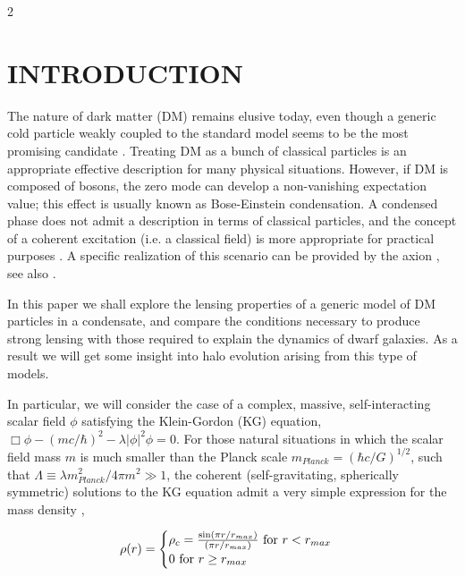 \documentclass {article}
\begin{document}
\begin {multicols} {2}


\section {\normalsize {INTRODUCTION}}


The nature of dark matter (DM) remains elusive today, even though a generic cold particle weakly coupled to the standard model seems to be the most promising candidate \cite {Bertone_2005}. Treating DM as a bunch of classical particles is an appropriate effective description for many physical situations. However, if DM is composed of bosons, the zero mode can develop a non-vanishing expectation value; this effect is usually known as Bose-Einstein condensation. A condensed phase does not admit a description in terms of classical particles, and the concept of a coherent excitation (i.e. a classical field) is more appropriate for practical purposes \cite {Chavanis_2012}. A specific realization of this scenario can be provided by the axion \cite {Sikivie_2009}, see also \cite {B_hm_2004}.


In this paper we shall explore the lensing properties of a generic model of DM particles in a condensate, and compare the conditions necessary to produce strong lensing with those required to explain the dynamics of dwarf galaxies. As a result we will get some insight into halo evolution arising from this type of models.


In particular, we will consider the case of a complex, massive, self-interacting scalar field $\phi$ satisfying the Klein-Gordon (KG) equation, $\Box\phi - (mc/\hbar)^2 - \lambda|\phi|^2\phi = 0$. For those natural situations in which the scalar field mass $m$ is much smaller than the Planck scale $m_{Planck} = (\hbar c / G)^{1/2}$, such that $\Lambda \equiv \lambda m_{Planck}^2 / 4 \pi m^2 \gg 1$, the coherent (self-gravitating, spherically symmetric) solutions to the KG equation admit a very simple expression for the mass density \cite {Lee_1996, Arbey_2003},

\begin {equation} \label {eq:1}
	\rho (r) = 
		\begin {cases}
		\rho_c = \frac {\sin (\pi r/ r_{max})} {(\pi r / r_{max})}$ for $ r < r_{max}
		 \\ 
		0 $ for $ r \geq r_{max}
		\end {cases}
\end {equation}


\end{multicols}
\end{document}

